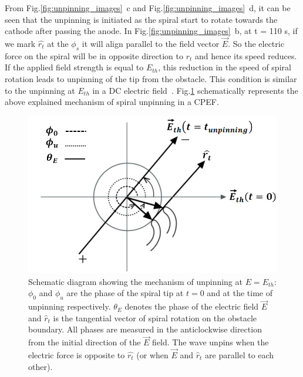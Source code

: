 \documentclass[%
 preprint,
 amsmath,amssymb,
 aps,
]{revtex4-2}
\begin{document}
From Fig.\ref{fig:unpinning_images}~c and Fig.\ref{fig:unpinning_images}~d, it can be seen that the unpinning is initiated as the spiral start to rotate towards the cathode after passing the anode. 
In Fig.\ref{fig:unpinning_images}~b, at t = 110 s, if we mark $\hat{r_t}$ at the $\phi_{s}$ it will align parallel to the field vector $\vec{E}$. So the electric force on the spiral will be in opposite direction to $\hat{r_t}$ and hence its speed reduces. If the applied field strength is equal to $E_{th}$, this reduction in the speed of spiral rotation leads to unpinning of the tip from the obstacle. This condition is similar to the unpinning at $E_{th}$ in a DC electric field~\cite{dcmechanism}. Fig.\ref{fig:acw_theory} schematically represents the above explained mechanism of spiral unpinning in a CPEF. 

\begin{figure}[H]
    \centering
    \includegraphics[width=0.8\linewidth]{theory.png}
    \caption{Schematic diagram showing the mechanism of unpinning at $E=E_{th}$: $\phi_{0}$ and  $\phi_{u}$ are the phase of the spiral tip at $t=0$ and at the time of unpinning respectively. $\theta_{E}$ denotes the phase of the electric field ${\vec{E}}$ and ${\hat{r}}_{t}$ is the tangential vector of spiral rotation on the obstacle boundary. All phases are measured in the anticlockwise direction from the initial direction of the $\vec{E}$ field. The wave unpins when the electric force is opposite to $\hat{r_t}$ (or when ${\vec{E}}$ and ${\hat{r}}_{t}$ are parallel to each other).
    }
    
    \label{fig:acw_theory}
\end{figure}

\end{document}
